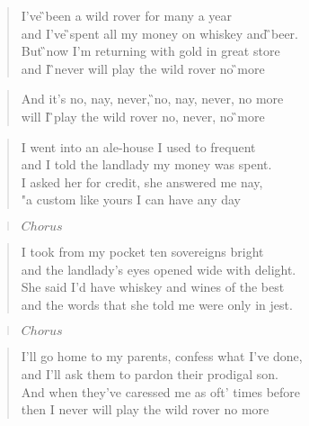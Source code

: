 \documentclass[9pt,a4paper,oneside, onecolumn]{article}
\begin{document}
\raggedcolumns
\begin{small}

\begin{verse}
I've \G{}been a wild rover for many a \C{}year\\
and I've \G{}spent all my \C{}money on \Ds{}whiskey and \G{}beer.\\
But \G{}now I'm returning with gold in great \C{}store\\
and I \G{}never will \C{}play the wild \Ds{}rover no \G{}more\\
\end{verse}

\begin{verse}
And it's \Ds{}no, nay, never,\qquad
\G{}no, nay, never, no \C{}more\\
will I \G{}play the wild \C{}rover
no, \Ds{}never, no \G{}more\\
\end{verse}

\begin{verse}
I went into an ale-house I used to frequent\\
and I told the landlady my money was spent.\\
I asked her for credit, she answered me nay,\\
"a custom like yours I can have any day\\
\end{verse}

\begin{verse}
$Chorus$
\end{verse}

\begin{verse}
I took from my pocket ten sovereigns bright\\
and the landlady's eyes opened wide with delight.\\
She said I'd have whiskey and wines of the best\\
and the words that she told me were only in jest.\\
\end{verse}

\begin{verse}
$Chorus$
\end{verse}

\begin{verse}
I'll go home to my parents, confess what I've done,\\
and I'll ask them to pardon their prodigal son.\\
And when they've caressed me as oft' times before\\
then I never will play the wild rover no more\\
\end{verse}


\end{small}
\end{document}
